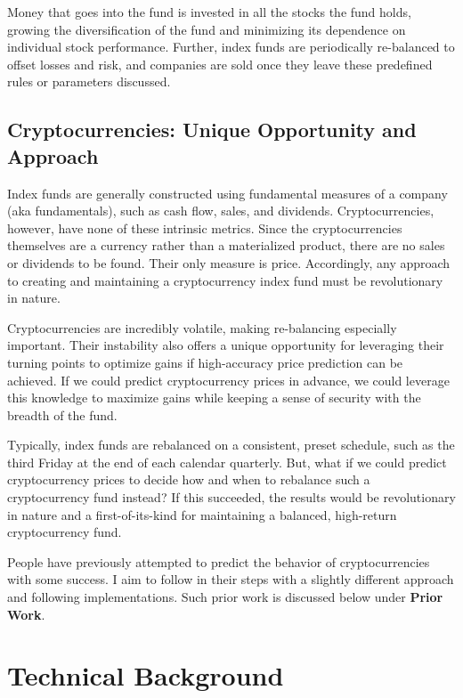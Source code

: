 \documentclass[10pt,twocolumn]{article}
\begin{document}
Money that goes into the fund is invested in all the stocks the fund holds, growing the diversification of the fund and minimizing its dependence on individual stock performance. Further, index funds are periodically re-balanced to offset losses and risk, and companies are sold once they leave these predefined rules or parameters discussed.

\subsection{Cryptocurrencies: Unique Opportunity and Approach}

Index funds are generally constructed using fundamental measures of a company (aka fundamentals), such as cash flow, sales, and dividends. Cryptocurrencies, however, have none of these intrinsic metrics. Since the cryptocurrencies themselves are a currency rather than a materialized product, there are no sales or dividends to be found. Their only measure is price. Accordingly, any approach to creating and maintaining a cryptocurrency index fund must be revolutionary in nature.

Cryptocurrencies are incredibly volatile, making re-balancing especially important. Their instability also offers a unique opportunity for leveraging their turning points to optimize gains if high-accuracy price prediction can be achieved. If we could predict cryptocurrency prices in advance, we could leverage this knowledge to maximize gains while keeping a sense of security with the breadth of the fund.

Typically, index funds are rebalanced on a consistent, preset schedule, such as the third Friday at the end of each calendar quarterly. But, what if we could predict cryptocurrency prices to decide how and when to rebalance such a cryptocurrency fund instead? If this succeeded, the results would be revolutionary in nature and a first-of-its-kind for maintaining a balanced, high-return cryptocurrency fund.

People have previously attempted to predict the behavior of cryptocurrencies with some success. I aim to follow in their steps with a slightly different approach and following implementations. Such prior work is discussed below under \textbf{Prior Work}.


\section{Technical Background}
\end{document}
